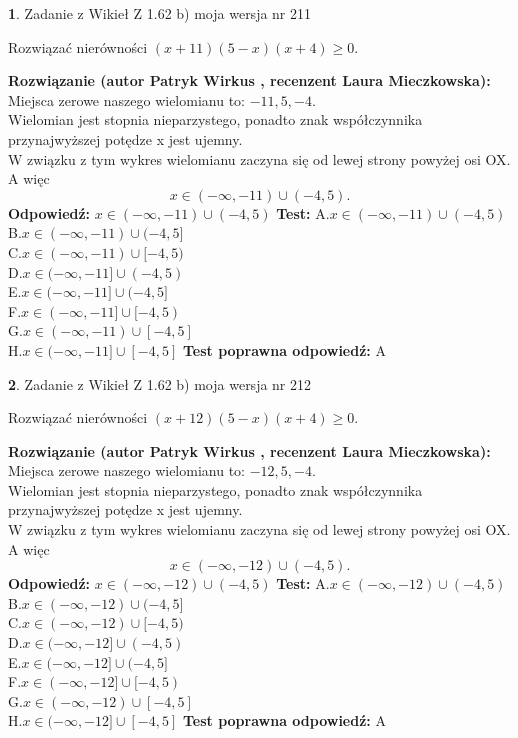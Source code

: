 \documentclass[12pt, a4paper]{article}
\theoremstyle{definition} %
\newtheorem{zad}{}
\newcommand{\zadStart}[1]{\begin{zad}#1\newline}
\newcommand{\zadStop}{\end{zad}}
\newcommand{\rozwStart}[2]{\noindent \textbf{Rozwiązanie (autor #1 , recenzent #2): }\newline}
\newcommand{\rozwStop}{\newline}
\newcommand{\odpStart}{\noindent \textbf{Odpowiedź:}\newline}
\newcommand{\odpStop}{\newline}
\newcommand{\testStart}{\noindent \textbf{Test:}\newline}
\newcommand{\testStop}{\newline}
\newcommand{\kluczStart}{\noindent \textbf{Test poprawna odpowiedź:}\newline}
\newcommand{\kluczStop}{\newline}
\begin{document}
\zadStart{Zadanie z Wikieł Z 1.62 b) moja wersja nr 211}

Rozwiązać nierówności $(x+11)(5-x)(x+4)\ge0$.
\zadStop
\rozwStart{Patryk Wirkus}{Laura Mieczkowska}
Miejsca zerowe naszego wielomianu to: $-11, 5, -4$.\\
Wielomian jest stopnia nieparzystego, ponadto znak współczynnika przy\linebreak najwyższej potędze x jest ujemny.\\ W związku z tym wykres wielomianu zaczyna się od lewej strony powyżej osi OX. A więc $$x \in (-\infty,-11) \cup (-4,5).$$
\rozwStop
\odpStart
$x \in (-\infty,-11) \cup (-4,5)$
\odpStop
\testStart
A.$x \in (-\infty,-11) \cup (-4,5)$\\
B.$x \in (-\infty,-11) \cup (-4,5]$\\
C.$x \in (-\infty,-11) \cup [-4,5)$\\
D.$x \in (-\infty,-11] \cup (-4,5)$\\
E.$x \in (-\infty,-11] \cup (-4,5]$\\
F.$x \in (-\infty,-11] \cup [-4,5)$\\
G.$x \in (-\infty,-11) \cup [-4,5]$\\
H.$x \in (-\infty,-11] \cup [-4,5]$
\testStop
\kluczStart
A
\kluczStop



\zadStart{Zadanie z Wikieł Z 1.62 b) moja wersja nr 212}

Rozwiązać nierówności $(x+12)(5-x)(x+4)\ge0$.
\zadStop
\rozwStart{Patryk Wirkus}{Laura Mieczkowska}
Miejsca zerowe naszego wielomianu to: $-12, 5, -4$.\\
Wielomian jest stopnia nieparzystego, ponadto znak współczynnika przy\linebreak najwyższej potędze x jest ujemny.\\ W związku z tym wykres wielomianu zaczyna się od lewej strony powyżej osi OX. A więc $$x \in (-\infty,-12) \cup (-4,5).$$
\rozwStop
\odpStart
$x \in (-\infty,-12) \cup (-4,5)$
\odpStop
\testStart
A.$x \in (-\infty,-12) \cup (-4,5)$\\
B.$x \in (-\infty,-12) \cup (-4,5]$\\
C.$x \in (-\infty,-12) \cup [-4,5)$\\
D.$x \in (-\infty,-12] \cup (-4,5)$\\
E.$x \in (-\infty,-12] \cup (-4,5]$\\
F.$x \in (-\infty,-12] \cup [-4,5)$\\
G.$x \in (-\infty,-12) \cup [-4,5]$\\
H.$x \in (-\infty,-12] \cup [-4,5]$
\testStop
\kluczStart
A
\kluczStop
\end{document}
